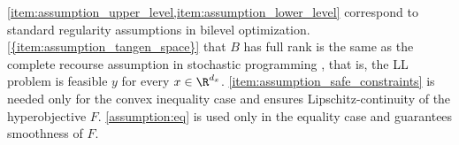 \cref{item:assumption_upper_level,item:assumption_lower_level} correspond to standard regularity assumptions in bilevel optimization. 
\cref{{item:assumption_tangen_space}} that  $B$ has full rank is the same as the complete recourse assumption in stochastic programming \cite{shapiro2021lectures}, that is, the LL problem is feasible $y$ for every $x\in\R^{d_x}$.
\cref{item:assumption_safe_constraints} is  needed only for the convex inequality case 
and ensures Lipschitz-continuity of the hyperobjective $F$. 
\cref{assumption:eq} is used only in the equality case and guarantees smoothness of $F$.

\iffalse
Specifically, we also assume that the optimal solution $y^*(x)$ to be Lipschitz in $x$, and the dual solution is upper bounded by a constant $R$. 
\begin{assumption}[Bilevel solution assumptions]\label{assumption:safe-constraints}
    Given $x$, the lower level problem primal solution $y^*$, and the dual solution $\gamma(x)$, we assume
    \begin{itemize}
        \item $y^*(x)$ is $L_y$-Lipschitz in $x$. 
        \item The dual solution $\gamma(x)$ is upper bounded: $\norm{\gamma(x)} \leq R$.
    \end{itemize}
\end{assumption}
\fi 